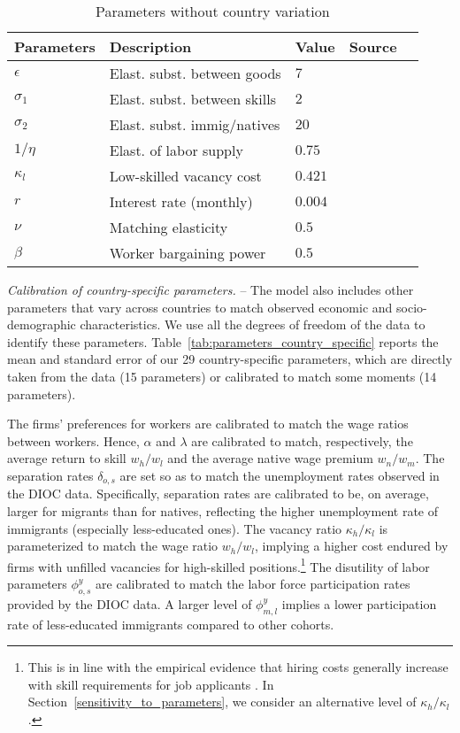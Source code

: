 \documentclass[a4paper,12pt]{article}
\begin{document}
\begin{table}[htb!]
\centering
\par
\caption{Parameters without country variation}
\label{tab:general_parameters}
\footnotesize
\begin{tabular}{lllll}
\hline\hline
Parameters & Description & Value & Source \\ \hline
$\epsilon $ & Elast. subst. between goods & $7$ & \cite{Feenstra1994}\\
$\sigma_1$ & Elast. subst. between skills & $2$ & \cite{Ottaviano2012}\\
$\sigma_2$ & Elast. subst. immig/natives & $20$ & \cite{Ottaviano2012}\\
$1/ \eta$ & Elast. of labor supply & $0.75$ & \cite{ChettyEtAl2011}\\
$\kappa_l$ & Low-skilled vacancy cost & $0.421$ & \cite{Chassamboulli2014}\\
$r$ & Interest rate (monthly) & $0.004$ & \cite{Chassamboulli2014}\\
$\nu$ & Matching elasticity & $0.5$ & \cite{Petrongolo2001}\\
$ \beta$ & Worker bargaining power & $0.5$ & \cite{Hosios1990}\\
 \hline\hline
\end{tabular}
\end{table}

\emph{Calibration of country-specific parameters.} -- The model also includes other parameters that vary across countries to match observed economic and socio-demographic characteristics. We use all the degrees of freedom of the data to identify these parameters. Table~\ref{tab:parameters_country_specific} reports the mean and standard error of our 29 country-specific parameters, which are directly taken from the data (15 parameters) or calibrated to match some moments (14 parameters).

The firms’ preferences for workers are calibrated to match the wage ratios between workers. Hence, $\alpha$ and $\lambda$ are calibrated to match, respectively, the average return to skill $w_h/w_l$ and the average native wage premium $w_n/w_m$. The separation rates $\delta_{o,s}$ are set so as to match the unemployment rates observed in the DIOC data. Specifically, separation rates are calibrated to be, on average, larger for migrants than for natives, reflecting the higher unemployment rate of immigrants (especially less-educated ones). The vacancy ratio $\kappa_h / \kappa_l$ is parameterized to match the wage ratio $w_h/w_l$, implying a higher cost endured by firms with unfilled vacancies for high-skilled positions.\footnote{This is in line with the empirical evidence that hiring costs generally increase with skill requirements for job applicants \citep[see][]{BlatterEtAl2012}. In Section~\ref{sensitivity_to_parameters}, we consider an alternative level of $\kappa_h / \kappa_l$.} The disutility of labor parameters $\phi^y_{o,s}$ are calibrated to match the labor force participation rates provided by the DIOC data. A larger level of $\phi^y_{m,l}$ implies a lower participation rate of less-educated immigrants compared to other cohorts.
\end{document}
